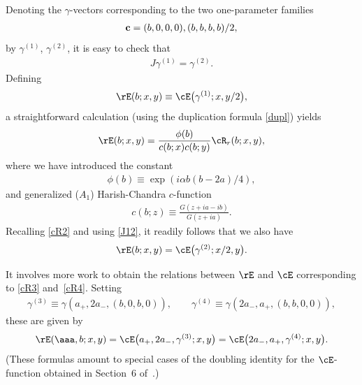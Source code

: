 Denoting the $\gamma$-vectors corresponding to the two one-parameter families
\begin{gather}
{\bf c}=(b,0,0,0), (b,b,b,b)/2,
\end{gather}
by $\gamma^{(1)}$,  $\gamma^{(2)}$, it is easy to check that
\begin{gather}\label{J12}
J\gamma^{(1)}=\gamma^{(2)}.
\end{gather}
Def\/ining
\begin{gather}\label{EcE}
\rE(b;x,y)\equiv \cE\big(\gamma^{(1)};x,y/2\big),
\end{gather}
a straightforward calculation (using the duplication formula \eqref{dupl}) yields
\begin{gather}\label{ER}
\rE(b;x,y)=\frac{\phi(b)}{c(b;x)c(b;y)}\cR_r(b;x,y),
\end{gather}
where we have introduced the constant
\begin{gather}\label{phib}
\phi(b)\equiv \exp(i\alpha b(b-2a)/4),
\end{gather}
and generalized ($A_1$) Harish-Chandra $c$-function
\begin{gather}\label{cb}
c(b;z)\equiv \frac{G(z+ia-ib)}{G(z+ia)}.
\end{gather}
Recalling \eqref{cR2} and using \eqref{J12}, it readily follows that we also have
\begin{gather}
\rE(b;x,y)=\cE\big(\gamma^{(2)};x/2,y\big).
\end{gather}

It involves more work to obtain the relations between $\rE$ and $\cE$ corresponding to \eqref{cR3} and~\eqref{cR4}. Setting
\begin{gather}
\gamma^{(3)}\equiv \gamma(a_{+},2a_{-},(b,0,b,0)),\qquad \gamma^{(4)}\equiv \gamma(2a_{-},a_{+},(b,b,0,0)),
\end{gather}
these are given by
\begin{gather}
\rE(\aaa,b;x,y)=\cE\big(a_{+},2a_{-},\gamma^{(3)};x,y\big)=\cE\big(2a_{-},a_{+},\gamma^{(4)};x,y\big).
\end{gather}
(These formulas amount to special cases of the doubling identity for the $\cE$-function obtained in Section~6 of~\cite{quad}.)

